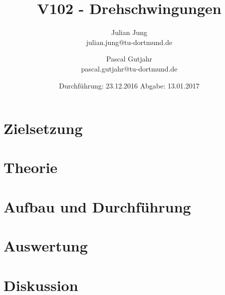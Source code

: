 

\title{V102 - Drehschwingungen}
\author{Julian Jung \\ julian.jung@tu-dortmund.de
  \and Pascal Gutjahr \\ pascal.gutjahr@tu-dortmund.de}
  \date{Durchführung: 23.12.2016
  \hspace{3em}
  Abgabe: 13.01.2017}
  
\maketitle
\newpage
\tableofcontents
\newpage
\section{Zielsetzung}
\section{Theorie}
\section{Aufbau und Durchführung}
\section{Auswertung}
\section{Diskussion}
\printbibliography

